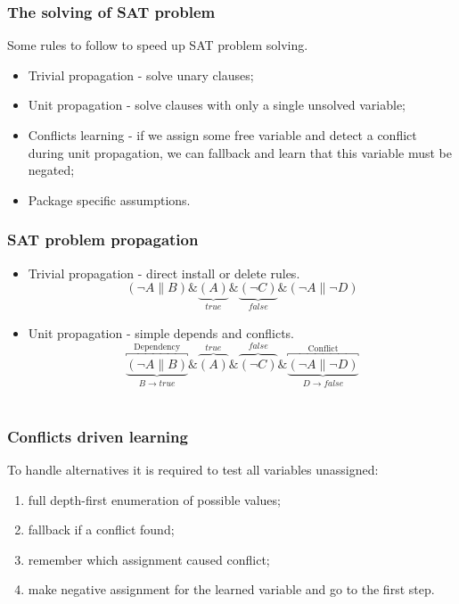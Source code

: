 \documentclass{beamer}
\begin{document}
\begin{frame}
\frametitle{The solving of SAT problem}

Some rules to follow to speed up SAT problem solving.
\begin{itemize}
  \item Trivial propagation - solve unary clauses;
  \item Unit propagation - solve clauses with only a single unsolved variable;
  \item Conflicts learning - if we assign some free variable and detect a
  conflict during unit propagation, we can fallback and learn that this variable
  must be negated;
  \item Package specific assumptions. 
\end{itemize}
\end{frame}

\begin{frame}
\frametitle{SAT problem propagation}
\begin{itemize}
  \item Trivial propagation - direct install or delete rules.
  \bigskip
  \[
  (\neg A \| B) \& \underbrace{(A)}_{\textit{true}} \&
  \underbrace{(\neg C)}_{\textit{false}} \& (\neg A \| \neg D)
  \]
  \pause
  \item Unit propagation - simple depends and conflicts.
  \bigskip
  \[
  \overbracket{\underbrace{(\neg A \| B)}_{B \rightarrow \textit{true}}}^{\text{Dependency}} \& \overbrace{(A)}^{\textit{true}}
  \& \overbrace{(\neg C)}^{\textit{false}} \&
  \overbracket{\underbrace{(\neg A \| \neg D)}_{D \rightarrow \textit{false}}}^{\text{Conflict}}
  \]
  \
\end{itemize}
\end{frame}

\begin{frame}
\frametitle{Conflicts driven learning}
To handle alternatives it is required to test all variables unassigned:
\begin{enumerate}
  \item full depth-first enumeration of possible values;
  \item fallback if a conflict found;
  \item remember which assignment caused conflict;
  \item make negative assignment for the learned variable and go to the first
  step.
\end{enumerate}
\end{frame}
\end{document}
